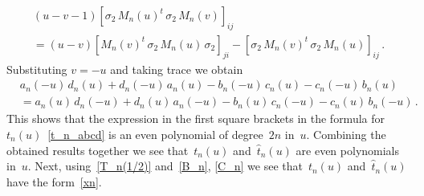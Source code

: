 \documentclass[a4paper,11pt]{article}
\numberwithin{equation}{section}
\begin{document}
\begin{multline} \nonumber
	(u-v-1)\left[\sigma_2\,M_n(u)^t\,\sigma_2\,M_n(v)\right]_{ij} \\
	= 
	(u-v)\left[M_n(v)^t\,\sigma_2\,M_n(u)\,\sigma_2\right]_{ji} - \left[\sigma_2\,M_n(v)^t\,\sigma_2\,M_n(u)\right]_{ij} \,.
\end{multline}
Substituting $v=-u$ and taking trace we obtain
\begin{align*} \nonumber
	&
	a_n(-u)\,d_n(u) + d_n(-u)\,a_n(u) - b_n(-u)\,c_n(u) - c_n(-u)\,b_n(u) \\
	&
	= a_n(u)\,d_n(-u) + d_n(u)\,a_n(-u) - b_n(u)\,c_n(-u) - c_n(u)\,b_n(-u)\,.
\end{align*}
This shows that the expression in the first square brackets in the formula for~$t_n(u)$~\eqref{t_n_abcd} is an even polynomial of degree~$2n$ in~$u$.
Combining the obtained results together we see that~$t_n(u)$ and~$\hat{t}_n(u)$ are even polynomials in~$u$. 
Next, using~\eqref{T_n(1/2)} and~\eqref{B_n}, \eqref{C_n} we see that~$t_n(u)$ and~$\hat{t}_n(u)$ have the form~\eqref{xn}.
\end{document}
